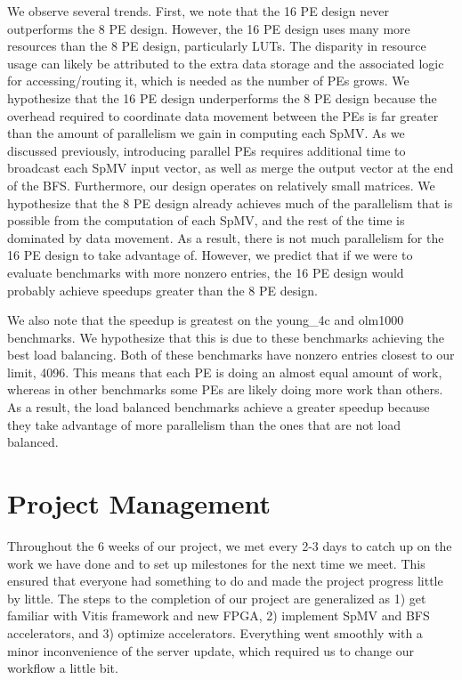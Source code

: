 \documentclass[10pt]{article}
\begin{document}
We observe several trends. First, we note that the 16 PE design never outperforms the 8 PE design. However, the 16 PE design
uses many more resources than the 8 PE design, particularly LUTs. The disparity in resource usage can likely be attributed to
the extra data storage and the associated logic for accessing/routing it, which is needed as the number of PEs grows. We hypothesize
that the 16 PE design underperforms the 8 PE design because the overhead required to coordinate data movement between the PEs is far
greater than the amount of parallelism we gain in computing each SpMV. As we discussed previously, introducing parallel PEs requires
additional time to broadcast each SpMV input vector, as well as merge the output vector at the end of the BFS. Furthermore, our
design operates on relatively small matrices. We hypothesize that the 8 PE design already achieves much of the parallelism that is
possible from the computation of each SpMV, and the rest of the time is dominated by data movement. As a result, there is not
much parallelism for the 16 PE design to take advantage of. However, we predict that if we were to evaluate benchmarks with more
nonzero entries, the 16 PE design would probably achieve speedups greater than the 8 PE design.

We also note that the speedup is greatest on the young\_4c and olm1000 benchmarks. We hypothesize that this is due to these
benchmarks achieving the best load balancing. Both of these benchmarks have nonzero entries closest to our limit, 4096. This
means that each PE is doing an almost equal amount of work, whereas in other benchmarks some PEs are likely doing more work
than others. As a result, the load balanced benchmarks achieve a greater speedup because they take advantage of more parallelism
than the ones that are not load balanced.

\section{Project Management}

Throughout the 6 weeks of our project, we met every 2-3 days to catch up on the work we have done and to set up
milestones for the next time we meet. This ensured that everyone had something to do and made the project
progress little by little. The steps to the completion of our project are generalized as 1) get familiar with
Vitis framework and new FPGA, 2) implement SpMV and BFS accelerators, and 3) optimize accelerators. Everything went
smoothly with a minor inconvenience of the server update, which required us to change our workflow a little bit. \newline
\end{document}
